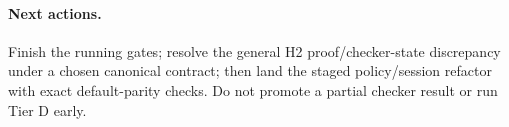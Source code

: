 \documentclass[11pt]{article}
\begin{document}
\paragraph{Next actions.} Finish the running gates; resolve the general H2
proof/checker-state discrepancy under a chosen canonical contract; then land
the staged policy/session refactor with exact default-parity checks. Do not
promote a partial checker result or run Tier D early.
\end{document}
